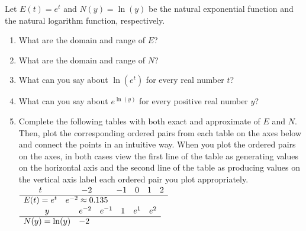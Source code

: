 \documentclass[nooutcomes]{ximera}
\begin{document}
\begin{exploration}
Let \(E(t) = e^t\) and \(N(y) = \ln(y)\) be the natural exponential function and the natural logarithm function, respectively.%

\begin{enumerate}[label=\alph*.]
\item\hypertarget{li-678}{}\hypertarget{p-1487}{}%
What are the domain and range of \(E\)?%
\item\hypertarget{li-679}{}\hypertarget{p-1488}{}%
What are the domain and range of \(N\)?%
\item\hypertarget{li-680}{}\hypertarget{p-1489}{}%
What can you say about \(\ln(e^t)\) for every real number \(t\)?%
\item\hypertarget{li-681}{}\hypertarget{p-1490}{}%
What can you say about \(e^{\ln(y)}\) for every positive real number \(y\)?%
\item\hypertarget{li-682}{}\hypertarget{p-1491}{}%
Complete the following tables with both exact and approximate of \(E\) and \(N\).  Then, plot the corresponding ordered pairs from each table on the axes below and connect the points in an intuitive way.  When you plot the ordered pairs on the axes, in both cases view the first line of the table as generating values on the horizontal axis and the second line of the table as producing values on the vertical axis label each ordered pair you plot appropriately.%
%
\\
$
\begin{array}{llllll}
\multicolumn{1}{c}{t}&\multicolumn{1}{c}{-2}&\multicolumn{1}{c}{-1}&\multicolumn{1}{c}{0}&\multicolumn{1}{c}{1}&\multicolumn{1}{c}{2}\\
\hline
E(t)=e^t&e^{-2} \approx 0.135&&&&
\end{array}
$
\\
$
\begin{array}{llllll}
\multicolumn{1}{c}{y}&\multicolumn{1}{c}{e^{-2}}&\multicolumn{1}{c}{e^{-1}}&\multicolumn{1}{c}{1}&\multicolumn{1}{c}{e^1}&\multicolumn{1}{c}{e^2}\\
\hline
N(y)=\ln(y)&-2&&&&
\end{array}
$
%


\end{enumerate}
\end{exploration}
\end{document}
